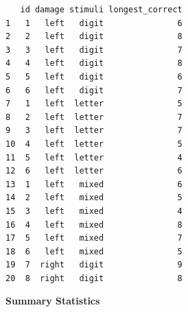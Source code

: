 \documentclass[]{article}
\begin{document}
\begin{verbatim}
   id damage stimuli longest_correct
1   1   left   digit               6
2   2   left   digit               8
3   3   left   digit               7
4   4   left   digit               8
5   5   left   digit               6
6   6   left   digit               7
7   1   left  letter               5
8   2   left  letter               7
9   3   left  letter               7
10  4   left  letter               5
11  5   left  letter               4
12  6   left  letter               6
13  1   left   mixed               6
14  2   left   mixed               5
15  3   left   mixed               4
16  4   left   mixed               8
17  5   left   mixed               7
18  6   left   mixed               5
19  7  right   digit               9
20  8  right   digit               8
\end{verbatim}

\clearpage

\textbf{Summary Statistics}
\end{document}
